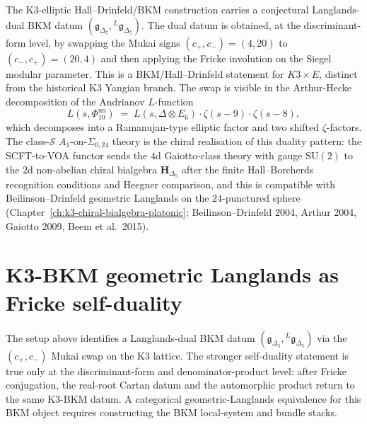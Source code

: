 \begin{remark}
\label{rem:glang-k3-bkm-opener}
The K3-elliptic Hall--Drinfeld/BKM construction carries a conjectural
Langlands-dual BKM datum
$(\mathfrak g_{\Delta_5}, {}^L\mathfrak g_{\Delta_5})$. The dual datum is
obtained, at the discriminant-form level, by swapping the Mukai signs
$(c_+, c_-) = (4, 20)$ to $(c_-, c_+) = (20, 4)$ and then applying the
Fricke involution on the Siegel modular parameter. This is a BKM/Hall--Drinfeld
statement for $K3\times E$, distinct from the historical K3 Yangian branch.
The swap is visible in the Arthur-Hecke decomposition of the Andrianov
$L$-function
\[
L(s, \Phi_{10}^{\mathrm{un}}) \;=\; L(s, \Delta\otimes E_6)\cdot \zeta(s-9)\cdot \zeta(s-8),
\]
which decomposes into a Ramanujan-type elliptic factor and two shifted
$\zeta$-factors. The class-$\mathcal S$ $A_1$-on-$\Sigma_{0,24}$
theory is the chiral realisation of this duality pattern: the SCFT-to-VOA
functor sends the
$4$d Gaiotto-class theory with gauge $\mathrm{SU}(2)$ to the $2$d
non-abelian chiral bialgebra $\mathbf H_{\Delta_5}$ after the finite
Hall--Borcherds recognition conditions and Heegner comparison, and this is
compatible with Beilinson--Drinfeld geometric Langlands on the
$24$-punctured sphere
(Chapter~\ref{ch:k3-chiral-bialgebra-platonic}; Beilinson--Drinfeld 2004,
Arthur 2004, Gaiotto 2009, Beem et al.\ 2015).
\end{remark}

\section{K3-BKM geometric Langlands as Fricke self-duality}
\label{sec:gl-fricke-self-duality}

The setup above identifies a Langlands-dual BKM datum
$(\mathfrak{g}_{\Delta_5}, {}^L\mathfrak{g}_{\Delta_5})$ via the
$(c_+, c_-)$ Mukai swap on the K3 lattice. The stronger self-duality
statement is true only at the discriminant-form and denominator-product
level: after Fricke conjugation, the real-root Cartan datum and the
automorphic product return to the same K3-BKM datum. A categorical
geometric-Langlands equivalence for this BKM object requires constructing
the BKM local-system and bundle stacks.


